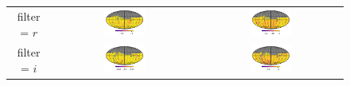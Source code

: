 \documentclass[preprintm,linenumbers]{aastex631}
\begin{document}
\begin{figure}
\begin{tabular}{c c c}
				filter = $r$ & \includegraphics[align=c,width=0.3\textwidth]{results/skymaps/skymaps_delta_first_year_one_snap_v4_0_10yrs_db_noDD_noTwi_CountMetric_doAllTemplateMetrics_reduceCount_r_7_noDD_noTwi} &			
				\includegraphics[align=c,width=0.3\textwidth]{results/skymaps/skymaps_delta_first_year_one_snap_v4_0_10yrs_db_noDD_noTwi_CountMetric_doAllTemplateMetrics_reduceCount_r_28_noDD_noTwi} \\
				
				filter = $i$ & \includegraphics[align=c,width=0.3\textwidth]{results/skymaps/skymaps_delta_first_year_one_snap_v4_0_10yrs_db_noDD_noTwi_CountMetric_doAllTemplateMetrics_reduceCount_i_7_noDD_noTwi} &				
				\includegraphics[align=c,width=0.3\textwidth]{results/skymaps/skymaps_delta_first_year_one_snap_v4_0_10yrs_db_noDD_noTwi_CountMetric_doAllTemplateMetrics_reduceCount_i_28_noDD_noTwi} \\
				

\end{tabular}
\end{figure}
\end{document}
